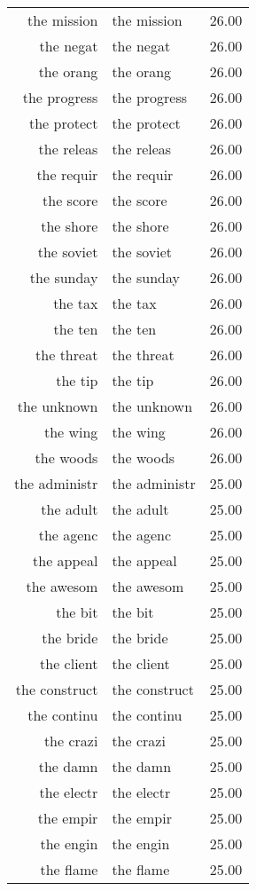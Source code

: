 \begin{table}[ht]
\begin{tabular}{rlr}
  the mission & the mission & 26.00 \\ 
  the negat & the negat & 26.00 \\ 
  the orang & the orang & 26.00 \\ 
  the progress & the progress & 26.00 \\ 
  the protect & the protect & 26.00 \\ 
  the releas & the releas & 26.00 \\ 
  the requir & the requir & 26.00 \\ 
  the score & the score & 26.00 \\ 
  the shore & the shore & 26.00 \\ 
  the soviet & the soviet & 26.00 \\ 
  the sunday & the sunday & 26.00 \\ 
  the tax & the tax & 26.00 \\ 
  the ten & the ten & 26.00 \\ 
  the threat & the threat & 26.00 \\ 
  the tip & the tip & 26.00 \\ 
  the unknown & the unknown & 26.00 \\ 
  the wing & the wing & 26.00 \\ 
  the woods & the woods & 26.00 \\ 
  the administr & the administr & 25.00 \\ 
  the adult & the adult & 25.00 \\ 
  the agenc & the agenc & 25.00 \\ 
  the appeal & the appeal & 25.00 \\ 
  the awesom & the awesom & 25.00 \\ 
  the bit & the bit & 25.00 \\ 
  the bride & the bride & 25.00 \\ 
  the client & the client & 25.00 \\ 
  the construct & the construct & 25.00 \\ 
  the continu & the continu & 25.00 \\ 
  the crazi & the crazi & 25.00 \\ 
  the damn & the damn & 25.00 \\ 
  the electr & the electr & 25.00 \\ 
  the empir & the empir & 25.00 \\ 
  the engin & the engin & 25.00 \\ 
  the flame & the flame & 25.00 \\ 

\end{tabular}
\end{table}
